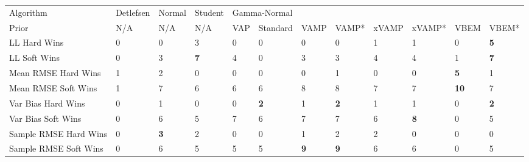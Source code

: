 \begin{tabular}{llllllllllll}
\toprule
Algorithm & Detlefsen &      Normal &     Student & \multicolumn{8}{l}{Gamma-Normal} \\
Prior &       N/A &         N/A &         N/A &          VAP &    Standard &        VAMP &       VAMP* & xVAMP &      xVAMP* &         VBEM &       VBEM* \\
\midrule
LL Hard Wins          &         0 &           0 &           3 &            0 &           0 &           0 &           0 &     1 &           1 &            0 &  \textbf{5} \\
LL Soft Wins          &         0 &           3 &  \textbf{7} &            4 &           0 &           3 &           3 &     4 &           4 &            1 &  \textbf{7} \\
Mean RMSE Hard Wins   &         1 &           2 &           0 &            0 &           0 &           0 &           1 &     0 &           0 &   \textbf{5} &           1 \\
Mean RMSE Soft Wins   &         1 &           7 &           6 &            6 &           6 &           8 &           8 &     7 &           7 &  \textbf{10} &           7 \\
Var Bias Hard Wins    &         0 &           1 &           0 &            0 &  \textbf{2} &           1 &  \textbf{2} &     1 &           1 &            0 &  \textbf{2} \\
Var Bias Soft Wins    &         0 &           6 &           5 &            7 &           6 &           7 &           7 &     6 &  \textbf{8} &            0 &           5 \\
Sample RMSE Hard Wins &         0 &  \textbf{3} &           2 &            0 &           0 &           1 &           2 &     2 &           0 &            0 &           0 \\
Sample RMSE Soft Wins &         0 &           6 &           5 &            5 &           5 &  \textbf{9} &  \textbf{9} &     6 &           6 &            0 &           5 \\
\bottomrule
\end{tabular}

